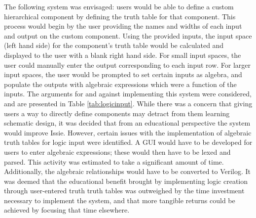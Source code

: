 The following system was envisaged: users would be able to define a custom hierarchical component by defining the truth table for that component. This process would begin by the user providing the names and widths of each input and output on the custom component. Using the provided inputs, the input space (left hand side) for the component's truth table would be calculated and displayed to the user with a blank right hand side. For small input spaces, the user could manually enter the output corresponding to each input row. For larger input spaces, the user would be prompted to set certain inputs as algebra, and populate the outputs with algebraic expressions which were a function of the inputs. The arguments for and against implementing this system were considered, and are presented in Table \ref{tab:logicinput}. While there was a concern that giving users a way to directly define components may detract from them learning schematic design, it was decided that from an educational perspective the system would improve Issie. However, certain issues with the implementation of algebraic truth tables for logic input were identified. A GUI would have to be developed for users to enter algebraic expressions; these would then have to be lexed and parsed. This activity was estimated to take a significant amount of time. Additionally, the algebraic relationships would have to be converted to Verilog. It was deemed that the educational benefit brought by implementing logic creation through user-entered truth truth tables was outweighed by the time investment necessary to implement the system, and that more tangible returns could be achieved by focusing that time elsewhere.

